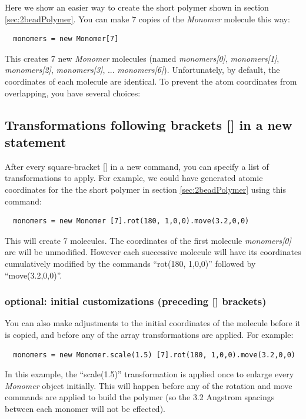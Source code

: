 \documentclass[11pt]{article}
\begin{document}
Here we show an easier way to create the short polymer 
shown in section \ref{sec:2beadPolymer}.
You can make 7 copies of the \textit{Monomer} molecule this way:
\begin{verbatim}
  monomers = new Monomer[7]
\end{verbatim}
This creates 7 new \textit{Monomer} molecules (named 
\mbox{\textit{monomers[0]}}, 
\mbox{\textit{monomers[1]}}, 
\mbox{\textit{monomers[2]}}, 
\mbox{\textit{monomers[3]}}, ... 
\mbox{\textit{monomers[6]}}).
Unfortunately, by default, the coordinates of each molecule are identical.
To prevent the atom coordinates from overlapping, you have several choices:

\subsection{Transformations following brackets [] in a new statement}
\label{sec:arrays+xform}
   After every square-bracket [] in a new command,
you can specify a list of transformations to apply.
For example, we could have generated atomic coordinates for the 
the short polymer in section \ref{sec:2beadPolymer}
using this command:
\begin{verbatim}
  monomers = new Monomer [7].rot(180, 1,0,0).move(3.2,0,0)
\end{verbatim}
This will create 7 molecules.  
The coordinates of the first molecule \textit{monomers[0]} are will be unmodified.
However each successive molecule will have its coordinates cumulatively
modified by the commands ``rot(180, 1,0,0)'' followed by ``move(3.2,0,0)''.
\subsubsection*{optional: initial customizations (preceding [] brackets)}
\label{sec:xform+arrays+xform} 
You can also make adjustments to the initial coordinates of the molecule
before it is copied, and before any of the array transformations are applied.
For example:
\begin{verbatim}
  monomers = new Monomer.scale(1.5) [7].rot(180, 1,0,0).move(3.2,0,0)
\end{verbatim}
In this example, the ``scale(1.5)'' transformation is applied once to 
enlarge every \textit{Monomer} object initially.
This will happen before any of the rotation and move commands 
are applied to build the polymer
(so the 3.2 Angstrom spacings between each monomer will not be effected).
\end{document}
